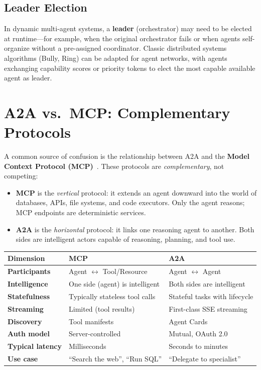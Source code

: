 \subsection{Leader Election}
\label{leader-election}

In dynamic multi-agent systems, a \textbf{leader} (orchestrator) may need to be elected at runtime---for example, when the original orchestrator fails or when agents self-organize without a pre-assigned coordinator. Classic distributed systems algorithms (Bully, Ring) can be adapted for agent networks, with agents exchanging capability scores or priority tokens to elect the most capable available agent as leader.

\section{A2A vs.~MCP: Complementary Protocols}
\label{sec:a2a:vs_mcp}

A common source of confusion is the relationship between A2A and the \textbf{Model Context Protocol (MCP)}~\cite{anthropic-mcp-2024}. These protocols are \emph{complementary}, not competing:

\begin{keybox}
\begin{itemize}
  \item \textbf{MCP} is the \emph{vertical} protocol: it extends an agent downward into the world of databases, APIs, file systems, and code executors. Only the agent reasons; MCP endpoints are deterministic services.
  \item \textbf{A2A} is the \emph{horizontal} protocol: it links one reasoning agent to another. Both sides are intelligent actors capable of reasoning, planning, and tool use.
\end{itemize}
\end{keybox}

\begin{tabular}{@{}lp{5cm}p{8cm}@{}}
\toprule
\textbf{Dimension} & \textbf{MCP} & \textbf{A2A} \\
\midrule
\textbf{Participants} & Agent $\leftrightarrow$ Tool/Resource & Agent $\leftrightarrow$ Agent \\
\textbf{Intelligence} & One side (agent) is intelligent & Both sides are intelligent \\
\textbf{Statefulness} & Typically stateless tool calls & Stateful tasks with lifecycle \\
\textbf{Streaming} & Limited (tool results) & First-class SSE streaming \\
\textbf{Discovery} & Tool manifests & Agent Cards \\
\textbf{Auth model} & Server-controlled & Mutual, OAuth 2.0 \\
\textbf{Typical latency} & Milliseconds & Seconds to minutes \\
\textbf{Use case} & ``Search the web'', ``Run SQL'' & ``Delegate to specialist'' \\
\bottomrule
\end{tabular}

